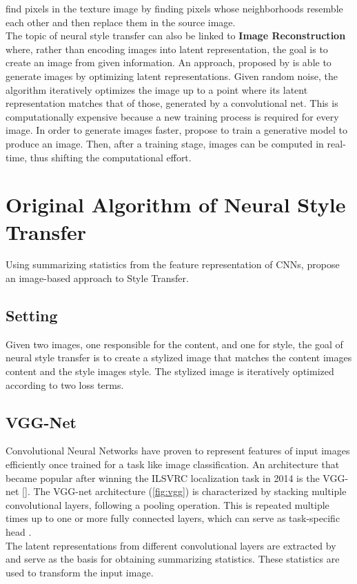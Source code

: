 \documentclass{seminar}
\begin{document}
	\cite{efros1999texture} find pixels in the texture image by finding pixels whose neighborhoods resemble each other and then replace them in the source image.\\
	The topic of neural style transfer can also be linked to \textbf{Image Reconstruction} where, rather than encoding images into latent representation, the goal is to create an image from given information. An approach, proposed by \cite{mahendran2015understanding} is able to generate images by optimizing latent representations. Given random noise, the algorithm iteratively optimizes the image up to a point where its latent representation matches that of those, generated by a convolutional net.
	This is computationally expensive because a new training process is required for every image. In order to generate images faster, \cite{dosovitskiy2016generating} propose to train a generative model to produce an image. Then, after a training stage, images can be computed in real-time, thus shifting the computational effort.
	
	
	
	
	\section{Original Algorithm of Neural Style Transfer}
	Using summarizing statistics from the feature representation of CNNs, \cite{gatys2015neural} propose an image-based approach to Style Transfer. %
	\subsection{Setting}
	Given two images, one responsible for the content, and one for style, the goal of neural style transfer is to create a stylized image that matches the content images content and the style images style. The stylized image is iteratively optimized according to two loss terms.
	
	\subsection{VGG-Net}
	Convolutional Neural Networks have proven to represent features of input images efficiently once trained for a task like image classification. An architecture that became popular after winning the ILSVRC localization task in 2014 is the VGG-net [\cite{ILSVRC15}]. The VGG-net architecture (\ref{fig:vgg}) is characterized by stacking multiple convolutional layers, following a pooling operation. This is repeated multiple times up to one or more fully connected layers, which can serve as task-specific head \cite{simonyan2014very}.\\
	The latent representations from different convolutional layers are extracted by \cite{gatys2015neural} and serve as the basis for obtaining summarizing statistics.
	These statistics are used to transform the input image.
	
\end{document}
